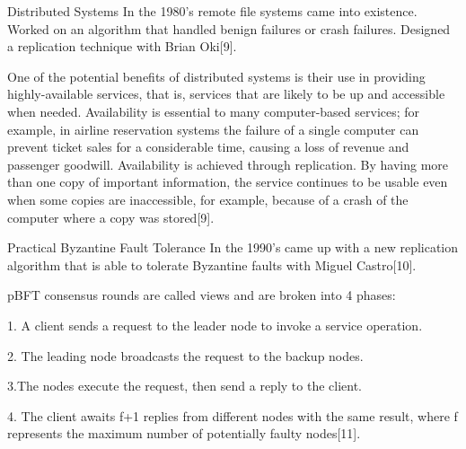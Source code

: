 \documentclass{beamer}
\begin{document}
\begin{frame}{Distributed Systems}
In the 1980’s remote file systems came into existence. Worked on an algorithm that handled benign failures or crash failures.
 Designed a replication technique with Brian Oki[9].
 
 \vspace{2mm}
 
 One of the potential benefits of distributed systems is their use in providing highly-available services, that is, services that are likely to be up and accessible when needed. Availability is essential to many computer-based services; for example, in airline reservation systems the failure of a single computer can prevent ticket sales for a considerable time, causing a loss of revenue and passenger goodwill. Availability is achieved through replication. By having more than one copy of important information, the service continues to be usable even when some copies are inaccessible, for example, because of a crash of the computer where a copy was stored[9].


    
\end{frame}
\begin{frame}{Practical Byzantine Fault Tolerance}
In the 1990's came up with a new replication algorithm that  is able to tolerate Byzantine faults with Miguel Castro[10].

\vspace{2mm}

pBFT consensus rounds are called views and are broken into 4 phases:

    \vspace{3mm}
    
   1. A client sends a request to the leader node to invoke a service operation.
   \newline
   
   2. The leading node broadcasts the request to the backup nodes.
   \newline
  
    3.The nodes execute the request, then send a reply to the client.
    \newline
    
   4. The client awaits f+1 replies from different nodes with the same result, where f represents the maximum number of potentially faulty nodes[11].
   
   \vspace{1mm}

\end{frame}
\end{document}
